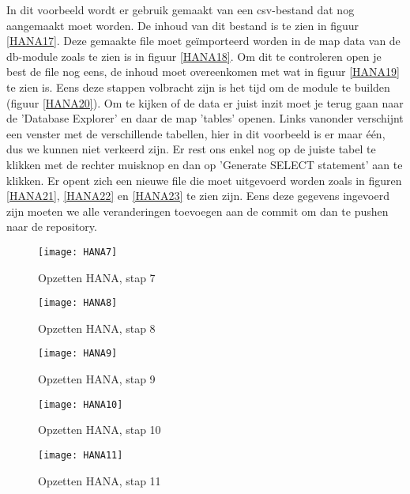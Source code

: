            In dit voorbeeld wordt er gebruik gemaakt van een csv-bestand dat nog aangemaakt moet worden. De inhoud van dit bestand is te zien in figuur \ref{HANA17}. Deze gemaakte file moet geïmporteerd worden in de map data van de db-module zoals te zien is in figuur \ref{HANA18}. Om dit te controleren open je best de file nog eens, de inhoud moet overeenkomen met wat in figuur \ref{HANA19} te zien is. Eens deze stappen volbracht zijn is het tijd om de module te builden (figuur \ref{HANA20}). Om te kijken of de data er juist inzit moet je terug gaan naar de 'Database Explorer' en daar de map 'tables' openen. Links vanonder verschijnt een venster met de verschillende tabellen, hier in dit voorbeeld is er maar één, dus we kunnen niet verkeerd zijn. Er rest ons enkel nog op de juiste tabel te klikken met de rechter muisknop en dan op 'Generate SELECT statement' aan te klikken. Er opent zich een nieuwe file die moet uitgevoerd worden zoals in figuren \ref{HANA21}, \ref{HANA22} en \ref{HANA23} te zien zijn.
            Eens deze gegevens ingevoerd zijn moeten we alle veranderingen toevoegen aan de commit om dan te pushen naar de repository.
            
            
            \begin{figure}	
                \centering
                \texttt{[image: HANA7]}
                \caption{Opzetten HANA, stap 7} \label{HANA7}
            \end{figure}
            
            \begin{figure}	
                \centering
                \texttt{[image: HANA8]}
                \caption{Opzetten HANA, stap 8} \label{HANA8}
            \end{figure}
            
            \begin{figure}	
                \centering
                \texttt{[image: HANA9]}
                \caption{Opzetten HANA, stap 9} \label{HANA9}
            \end{figure}
            
            \begin{figure}	
                \centering
                \texttt{[image: HANA10]}
                \caption{Opzetten HANA, stap 10} \label{HANA10}
            \end{figure}
            
            \begin{figure}	
                \centering
                \texttt{[image: HANA11]}
                \caption{Opzetten HANA, stap 11} \label{HANA11}
            \end{figure}
            

